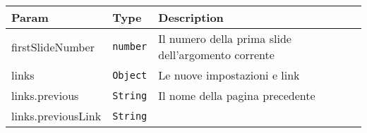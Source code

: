 \begin{tabularx}{\textwidth}{XXX}
\toprule
\begin{minipage}[b]{0.30\columnwidth}\raggedright
Param\strut
\end{minipage} & \begin{minipage}[b]{0.30\columnwidth}\raggedright
Type\strut
\end{minipage} & \begin{minipage}[b]{0.30\columnwidth}\raggedright
Description\strut
\end{minipage}\tabularnewline
\midrule
\endhead
\begin{minipage}[t]{0.30\columnwidth}\raggedright
firstSlideNumber\strut
\end{minipage} & \begin{minipage}[t]{0.30\columnwidth}\raggedright
\texttt{number}\strut
\end{minipage} & \begin{minipage}[t]{0.30\columnwidth}\raggedright
Il numero della prima slide dell'argomento corrente\strut
\end{minipage}\tabularnewline
\begin{minipage}[t]{0.30\columnwidth}\raggedright
links\strut
\end{minipage} & \begin{minipage}[t]{0.30\columnwidth}\raggedright
\texttt{Object}\strut
\end{minipage} & \begin{minipage}[t]{0.30\columnwidth}\raggedright
Le nuove impostazioni e link\strut
\end{minipage}\tabularnewline
\begin{minipage}[t]{0.30\columnwidth}\raggedright
links.previous\strut
\end{minipage} & \begin{minipage}[t]{0.30\columnwidth}\raggedright
\texttt{String}\strut
\end{minipage} & \begin{minipage}[t]{0.30\columnwidth}\raggedright
Il nome della pagina precedente\strut
\end{minipage}\tabularnewline
\begin{minipage}[t]{0.30\columnwidth}\raggedright
links.previousLink\strut
\end{minipage} & \begin{minipage}[t]{0.30\columnwidth}\raggedright
\texttt{String}\strut
\end{minipage} & \begin{minipage}[t]{0.30\columnwidth}\raggedright

\end{minipage}
\end{tabularx}
